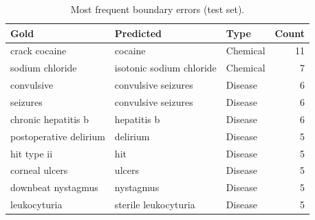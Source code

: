 \begin{table}[t]
\centering
\small
\caption{Most frequent boundary errors (test set).}
\label{tab:topbound}
\begin{tabular}{lllr}
\toprule
Gold & Predicted & Type & Count \\
\midrule
crack cocaine & cocaine & Chemical & 11 \\
sodium chloride & isotonic sodium chloride & Chemical & 7 \\
convulsive & convulsive seizures & Disease & 6 \\
seizures & convulsive seizures & Disease & 6 \\
chronic hepatitis b & hepatitis b & Disease & 6 \\
postoperative delirium & delirium & Disease & 5 \\
hit type ii & hit & Disease & 5 \\
corneal ulcers & ulcers & Disease & 5 \\
downbeat nystagmus & nystagmus & Disease & 5 \\
leukocyturia & sterile leukocyturia & Disease & 5 \\
\bottomrule
\end{tabular}
\end{table}
